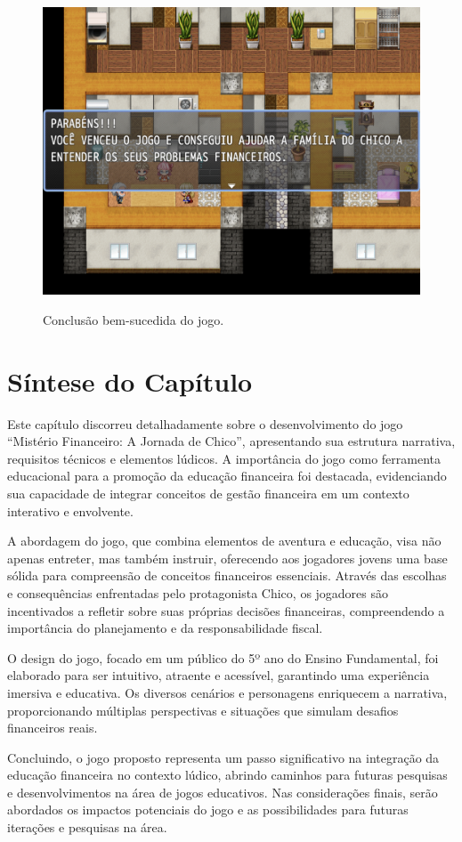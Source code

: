 \begin{figure}[!htbp]
	\centering
	\caption{Conclusão bem-sucedida do jogo.}
	\includegraphics[scale=0.4]{Textuais/Pictures/vitoria.png}
	\label{fig:vitoria}
\end{figure}

\section{Síntese do Capítulo}

Este capítulo discorreu detalhadamente sobre o desenvolvimento do jogo ``Mistério Financeiro: A Jornada de Chico'', apresentando sua estrutura narrativa, requisitos técnicos e elementos lúdicos. A importância do jogo como ferramenta educacional para a promoção da educação financeira foi destacada, evidenciando sua capacidade de integrar conceitos de gestão financeira em um contexto interativo e envolvente.

A abordagem do jogo, que combina elementos de aventura e educação, visa não apenas entreter, mas também instruir, oferecendo aos jogadores jovens uma base sólida para compreensão de conceitos financeiros essenciais. Através das escolhas e consequências enfrentadas pelo protagonista Chico, os jogadores são incentivados a refletir sobre suas próprias decisões financeiras, compreendendo a importância do planejamento e da responsabilidade fiscal.

O design do jogo, focado em um público do 5º ano do Ensino Fundamental, foi elaborado para ser intuitivo, atraente e acessível, garantindo uma experiência imersiva e educativa. Os diversos cenários e personagens enriquecem a narrativa, proporcionando múltiplas perspectivas e situações que simulam desafios financeiros reais.

Concluindo, o jogo proposto representa um passo significativo na integração da educação financeira no contexto lúdico, abrindo caminhos para futuras pesquisas e desenvolvimentos na área de jogos educativos. Nas considerações finais, serão abordados os impactos potenciais do jogo e as possibilidades para futuras iterações e pesquisas na área.
